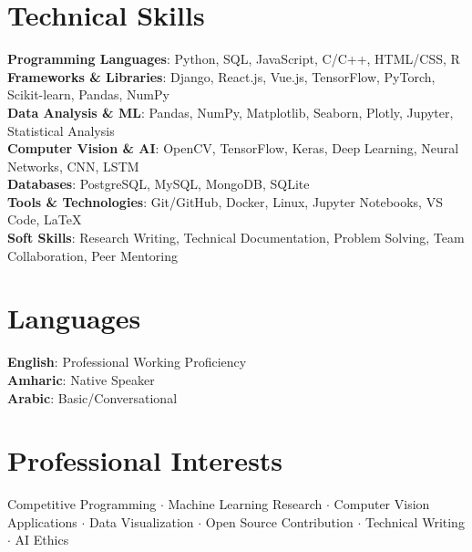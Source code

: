\documentclass[letterpaper,11pt]{article}
\begin{document}
\section{Technical Skills}
 \begin{itemize}[leftmargin=0.15in, label={}]
    \small{\item{
     \textbf{Programming Languages}{: Python, SQL, JavaScript, C/C++, HTML/CSS, R} \\
     \textbf{Frameworks \& Libraries}{: Django, React.js, Vue.js, TensorFlow, PyTorch, Scikit-learn, Pandas, NumPy} \\
     \textbf{Data Analysis \& ML}{: Pandas, NumPy, Matplotlib, Seaborn, Plotly, Jupyter, Statistical Analysis} \\
     \textbf{Computer Vision \& AI}{: OpenCV, TensorFlow, Keras, Deep Learning, Neural Networks, CNN, LSTM} \\
     \textbf{Databases}{: PostgreSQL, MySQL, MongoDB, SQLite} \\
     \textbf{Tools \& Technologies}{: Git/GitHub, Docker, Linux, Jupyter Notebooks, VS Code, LaTeX} \\
     \textbf{Soft Skills}{: Research Writing, Technical Documentation, Problem Solving, Team Collaboration, Peer Mentoring}
    }}
 \end{itemize}
 \vspace{-16pt}

\section{Languages}
 \begin{itemize}[leftmargin=0.15in, label={}]
    \small{\item{
     \textbf{English}{: Professional Working Proficiency} \\
     \textbf{Amharic}{: Native Speaker} \\
     \textbf{Arabic}{: Basic/Conversational}
    }}
 \end{itemize}
 \vspace{-16pt}

\section{Professional Interests}
 \begin{itemize}[leftmargin=0.15in, label={}]
    \small{\item{
     Competitive Programming $\cdot$ Machine Learning Research $\cdot$ Computer Vision Applications $\cdot$ Data Visualization $\cdot$ Open Source Contribution $\cdot$ Technical Writing $\cdot$ AI Ethics
    }}
 \end{itemize}
\end{document}
